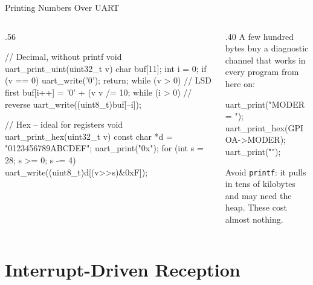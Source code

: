 \documentclass[9pt,aspectratio=169,xcolor=table]{beamer}
\begin{document}
\begin{frame}[fragile]{Printing Numbers Over UART}
    \begin{columns}[c]
    \begin{column}{.56\textwidth}
        \begin{cc}[basicstyle=\scriptsize\ttfamily]
// Decimal, without printf
void uart_print_uint(uint32_t v)
{
  char buf[11]; int i = 0;
  if (v == 0) {
    uart_write('0'); return;
  }
  while (v > 0) {       // LSD first
    buf[i++] = '0' + (v %
    v /= 10;
  }
  while (i > 0) {       // reverse
    uart_write((uint8_t)buf[--i]);
  }
}

// Hex -- ideal for registers
void uart_print_hex(uint32_t v)
{
  const char *d = "0123456789ABCDEF";
  uart_print("0x");
  for (int s = 28; s >= 0; s -= 4) {
    uart_write((uint8_t)d[(v>>s)&0xF]);
  }
}
    \end{cc}
    \end{column}
    \begin{column}{.40\textwidth}
        {\small A few hundred bytes buy a diagnostic channel that works in
        every program from here on:}

        \begin{cc}[basicstyle=\scriptsize\ttfamily]
uart_print("MODER = ");
uart_print_hex(GPIOA->MODER);
uart_print("\r\n");
        \end{cc}

        \vspace{2mm}
        {\small \alert{Avoid \texttt{printf}}: it pulls in tens of kilobytes
        and may need the heap. These cost almost nothing.}
    \end{column}
    \end{columns}
\end{frame}


\section{Interrupt-Driven Reception}
\end{document}
